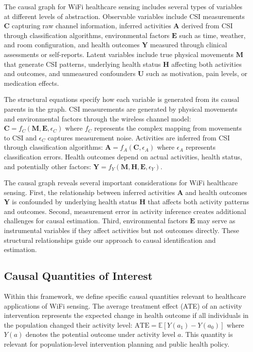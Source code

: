 \documentclass[journal]{IEEEtran}
\begin{document}
The causal graph for WiFi healthcare sensing includes several types of variables at different levels of abstraction. Observable variables include CSI measurements $\mathbf{C}$ capturing raw channel information, inferred activities $\mathbf{A}$ derived from CSI through classification algorithms, environmental factors $\mathbf{E}$ such as time, weather, and room configuration, and health outcomes $\mathbf{Y}$ measured through clinical assessments or self-reports. Latent variables include true physical movements $\mathbf{M}$ that generate CSI patterns, underlying health status $\mathbf{H}$ affecting both activities and outcomes, and unmeasured confounders $\mathbf{U}$ such as motivation, pain levels, or medication effects.

The structural equations specify how each variable is generated from its causal parents in the graph. CSI measurements are generated by physical movements and environmental factors through the wireless channel model: $\mathbf{C} = f_C(\mathbf{M}, \mathbf{E}, \epsilon_C)$ where $f_C$ represents the complex mapping from movements to CSI and $\epsilon_C$ captures measurement noise. Activities are inferred from CSI through classification algorithms: $\mathbf{A} = f_A(\mathbf{C}, \epsilon_A)$ where $\epsilon_A$ represents classification errors. Health outcomes depend on actual activities, health status, and potentially other factors: $\mathbf{Y} = f_Y(\mathbf{M}, \mathbf{H}, \mathbf{E}, \epsilon_Y)$.

The causal graph reveals several important considerations for WiFi healthcare sensing. First, the relationship between inferred activities $\mathbf{A}$ and health outcomes $\mathbf{Y}$ is confounded by underlying health status $\mathbf{H}$ that affects both activity patterns and outcomes. Second, measurement error in activity inference creates additional challenges for causal estimation. Third, environmental factors $\mathbf{E}$ may serve as instrumental variables if they affect activities but not outcomes directly. These structural relationships guide our approach to causal identification and estimation.

\subsection{Causal Quantities of Interest}

Within this framework, we define specific causal quantities relevant to healthcare applications of WiFi sensing. The average treatment effect (ATE) of an activity intervention represents the expected change in health outcome if all individuals in the population changed their activity level: $\text{ATE} = \mathbb{E}[Y(a_1) - Y(a_0)]$ where $Y(a)$ denotes the potential outcome under activity level $a$. This quantity is relevant for population-level intervention planning and public health policy.
\end{document}
